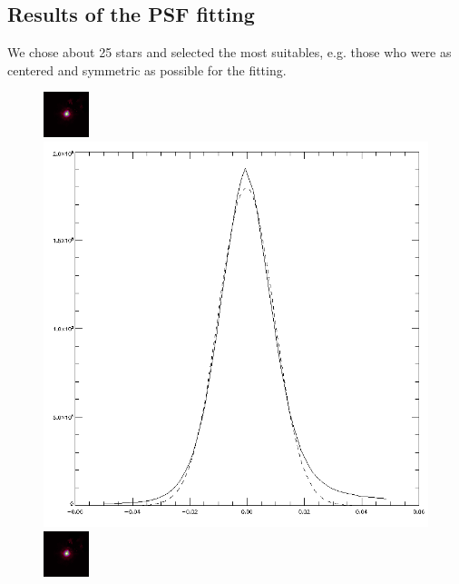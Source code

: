 \subsection{Results of the PSF fitting}
We chose about 25 stars and selected the most suitables, e.g. those who were as centered and symmetric as possible for the fitting. 
\begin{figure}[H]

\begin{minipage}{0.2 \textwidth}
		\includegraphics[scale = 2]{figures/Exposures/PSF_I}
\end{minipage}
\begin{minipage}{0.2 \textwidth}
\vspace{3pt}
\hspace{15pt}
		\includegraphics[scale=0.148]{figures/Exposures/psf_noise_I.png}
\end{minipage}
\hspace{50pt}
\begin{minipage}{0.2 \textwidth}
		\includegraphics[scale = 2]{figures/Exposures/PSF_I}

\end{minipage}
\end{figure}
